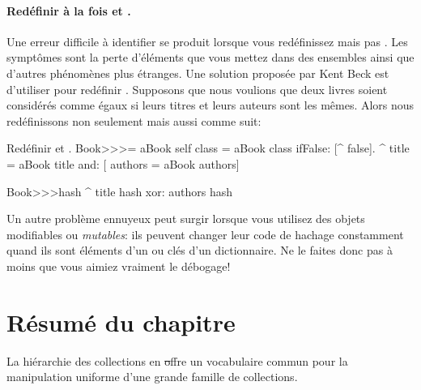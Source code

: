 \documentclass[a4paper,10pt,twoside]{book}
\begin{document}
\paragraph{Redéfinir à la fois \ct{=} et .}
Une erreur difficile à identifier se produit lorsque vous
redéfinissez \ct{=} mais pas . Les symptômes sont
la perte d'éléments que vous mettez dans des ensembles ainsi
que d'autres phénomènes plus étranges. Une solution proposée
par Kent Beck est d'utiliser  pour redéfinir .
Supposons que nous voulions que deux livres soient considérés comme
égaux si leurs titres et leurs auteurs sont les mêmes.
Alors nous redéfinissons non seulement
\ct{=} mais aussi  comme suit:

\begin{method}{Redéfinir \lct{=} et .}
Book>>>= aBook
   self class = aBook class ifFalse: [^ false].
   ^ title = aBook title and: [ authors = aBook authors]

Book>>>hash 
   ^ title hash xor: authors hash
\end{method}

Un autre problème ennuyeux peut surgir lorsque vous utilisez des
objets modifiables ou \emph{mutables}: ils peuvent changer leur
code de hachage constamment quand ils sont éléments d'un 
ou clés d'un dictionnaire. 
Ne le faites donc pas à moins que vous aimiez vraiment le débogage!

\section{Résumé du chapitre}

La hiérarchie des collections en \st offre un vocabulaire commun pour la manipulation uniforme d'une grande famille de collections.
\end{document}
